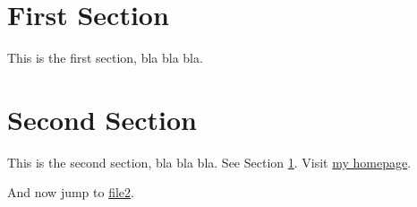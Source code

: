 \documentclass{article}
\begin{document}
\section{First Section}
\label{sec:1}

This is the first section, bla bla bla.
\newpage

\section{Second Section}
\label{sec:2}

This is the second section, bla bla bla.
See Section \ref{sec:1}.
Visit \href{http://www.snafu.de/~cschenk}{my homepage}.

And now jump to \href{file:file2#section.2}{file2}.
\end{document}
